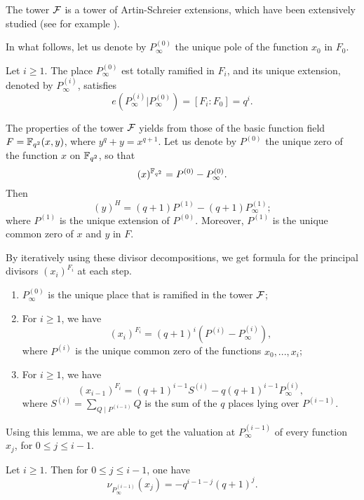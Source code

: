 \documentclass[10pt]{article}
\begin{document}
The tower $\cal{F}$ is a tower of Artin-Schreier extensions, which have been extensively studied (see for example \cite{S08}). 

In what follows, let us denote by $P_{\infty}^{(0)}$ the unique pole of the function $x_0$ in $F_0$.

\begin{lemma}\cite[Proposition 3.7.8]{S08}
	Let $i \geq 1$. The place $P_{\infty}^{(0)}$ est totally ramified in $F_i$, and its unique extension, denoted by $P_{\infty}^{(i)}$, satisfies
\[e\left(P_{\infty}^{(i)}|P_{\infty}^{(0)}\right) = [F_i:F_0]=q^i.\]
\end{lemma}


The properties of the tower $\mathcal{F}$ yields from those of the basic function field $F=\mathbb{F}_{q^2}(x,y)$, where $y^q+y=x^{q+1}$. Let us denote by $P^{(0)}$ the unique zero of the function $x$ on $\mathbb{F}_{q^2}$, so that
\[(x)^{\mathbb{F}_{q^2}} = P^{(0)} - P^{(0)}_{\infty}.\]
Then
\[(y)^H = (q+1)P^{(1)} - (q+1)P^{(1)}_{\infty};\]
where $P^{(1)}$ is the unique extension of $P^{(0)}$. Moreover, $P^{(1)}$ is the unique common zero of $x$ and $y$ in $F$.

By iteratively using these divisor decompositions, we get formula for the principal divisors $(x_i)^{F_i}$ at each step.
\begin{lemma} \label{div princ}
\begin{enumerate}
\item $P_{\infty}^{(0)}$ is the unique place that is ramified in the tower $\mathcal{F}$;
\item For $i \geq 1$, we have 
\[(x_i)^{F_i} = (q+1)^i \left(P^{(i)} - P_{\infty}^{(i)}\right),\]
where $P^{(i)}$ is the unique common zero of the functions $x_0,...,x_i$;
\item For $i \geq 1$, we have 
\[(x_{i-1})^{F_i} = (q+1)^{i-1}S^{(i)} - q(q+1)^{i-1}P_{\infty}^{(i)},\]
where $ S^{(i)} = \sum_{Q\mid P^{(i-1)}} Q$ is the sum of the $q$ places lying over $P^{(i-1)}$.
\end{enumerate}
\end{lemma}

Using this lemma, we are able to get the valuation at $P_{\infty}^{(i-1)}$ of every function $x_j$, for $0 \leq j \leq i-1$.

\begin{corollary} \label{val pinf}
Let $i \geq 1$. Then for $0 \leq j \leq i-1$, one have
\[\nu_{P_{\infty}^{(i-1)}}(x_j) = - q^{i-1-j}(q+1)^j.\]
\end{corollary}
\end{document}
